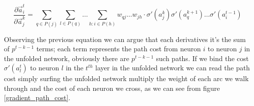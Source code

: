 \begin{equation} 
\frac{\partial \vec{a}_i^t}{\partial \vec{a}_j^k} = \sum_{q\in P(j)} \sum_{l \in P(q)} \hdots \sum_{h : i \in P(h)} w_{qj} \hdots w_{jh} \cdot \sigma'(a_j^k)\sigma'(a_q^{k+1}) \hdots \sigma'(a_i^{t-1})
\label{expanded_mem}
\end{equation}


Observing the previous equation we can argue that each derivatives it's the sum of $p^{t-k-1}$ terms; each term represents the path cost from neuron $i$ to neuron $j$ in the unfolded network, obviously
there are $p^{t-k-1}$ such paths. If we bind the cost $\sigma'(a_l^t)$ to neuron $l$ in the $t^{th}$ layer in the unfolded network we can read the path cost simply surfing the unfolded network multiply
the weight of each arc we walk through and the cost of each neuron we cross, as we can see from figure \ref{gradient_path_cost}.


